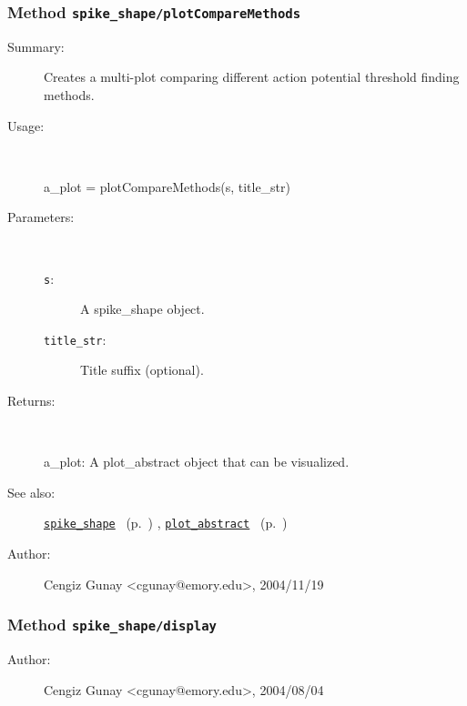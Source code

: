\subsubsection[Method \texttt{plotCompareMethods}]{Method \texttt{spike\_shape/plotCompareMethods}}%
%
\label{ref_spike_shape__plotCompareMethods}%
\hypertarget{ref_spike_shape__plotCompareMethods}{}%
\begin{description}
\item[Summary:]Creates a multi-plot comparing different action potential
			threshold finding methods.
%
\item[Usage:]~%
\begin{lyxcode}%
a\_plot = plotCompareMethods(s, title\_str)
%
\end{lyxcode}%
%
%
\item[Parameters:]~
\begin{description}%
\item[\texttt{s}:]
 A spike\_shape object.
\item[\texttt{title\_str}:]
 Title suffix (optional).
\end{description}%
%
\item[Returns:]~

	a\_plot: A plot\_abstract object that can be visualized.
%
%
\item[See also:]%
\hyperlink{ref_spike_shape}{\texttt{spike\_shape}}%
\ (p.~\pageref{ref_spike_shape})%
%
, \hyperlink{ref_plot_abstract}{\texttt{plot\_abstract}}%
\ (p.~\pageref{ref_plot_abstract})%
%
%
\item[Author:]%
Cengiz Gunay <cgunay@emory.edu>, 2004/11/19%
\end{description}
\methodline%
\subsubsection[Method \texttt{display}]{Method \texttt{spike\_shape/display}}%
%
\label{ref_spike_shape__display}%
\hypertarget{ref_spike_shape__display}{}%
\begin{description}
%
%
%
%
%
%
%
\item[Author:]%
Cengiz Gunay <cgunay@emory.edu>, 2004/08/04%
\end{description}
\methodline%
